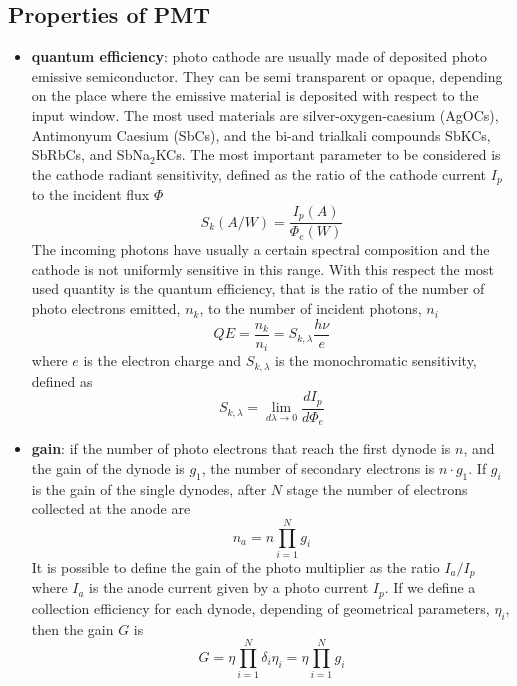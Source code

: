 \subsection{Properties of PMT}
\begin{itemize}
\item \textbf{quantum efficiency}: photo cathode are usually made of deposited photo emissive semiconductor. They can be semi transparent or opaque, depending on the place where the emissive material is deposited with respect to the input window.
The most used materials are silver-oxygen-caesium (AgOCs), Antimonyum Caesium (SbCs), and the bi-and trialkali compounds SbKCs, SbRbCs, and SbNa$_{2}$KCs. The most important parameter to be considered is the cathode radiant sensitivity, defined as the ratio of the cathode current $I_{p}$ to the incident flux $\Phi$
\begin{equation}
S_{k}(A/W)=\frac{I_{p}(A)}{\Phi _{e}(W)}
\end{equation}
The incoming photons have usually a certain spectral composition and the cathode is not uniformly sensitive in this range. With this respect the most used quantity is the quantum efficiency, that is the ratio of the number of photo electrons emitted, $n_{k}$, to the number of incident photons, $n_{i}$
\begin{equation}
QE = \frac{n_{k}}{n_{i}} = S_{k, \lambda} \frac{h\nu}{e}
\end{equation}
where $e$ is the electron charge and $S_{k, \lambda}$ is the monochromatic sensitivity, defined as
\begin{equation}
S_{k, \lambda} = \lim_{d\lambda \to 0}\frac{dI_{p}}{d\Phi _{e}}
\end{equation}
\item \textbf{gain}: if the number of photo electrons that reach the first dynode is $n$, and the gain of the dynode is $g_{1}$, the number of secondary electrons is $n\cdot g_{1}$. If $g_{i}$ is the gain of the single dynodes, after $N$ stage the number of electrons collected at the anode are
\begin{equation}
n_{a} = n\prod_{i=1}^N g_i
\end{equation}
It is possible to define the gain of the photo multiplier as the ratio $I_{a}/I_{p}$ where $I_{a}$ is the anode current given by a photo current $I_{p}$. If we define a collection efficiency for each dynode, depending of geometrical parameters, $\eta _{i}$, then the gain $G$ is
\begin{equation}
G = \eta \prod_{i=1}^N \delta _{i} \eta _{i} = \eta \prod_{i=1}^N g_{i}

\end{equation}
\end{itemize}
